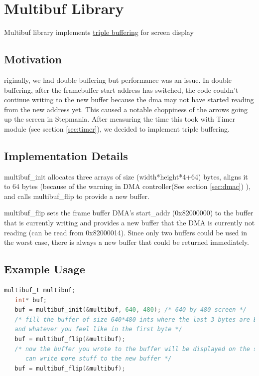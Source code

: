 \documentclass[10pt]{article}
\begin{document}
\section{Multibuf Library}

\label{sec:multibuf}

Multibuf library implements \href{http://en.wikipedia.org/wiki/Multiple_buffering#Triple_buffering}{triple buffering} for screen display 

\subsection{Motivation}

riginally, we had double buffering but performance was an issue. In double buffering, after the framebuffer start address has switched, the code couldn't continue writing to the new buffer because the dma may not have started reading from the new address yet. This caused a notable choppiness of the arrows going up the screen in Stepmania. After measuring the time this took with Timer module (see section \ref{sec:timer}), we decided to implement triple buffering. 

\subsection{Implementation Details}

multibuf\_init allocates three arrays of size (width*height*4+64) bytes, aligns it to 64 bytes (because of the warning in DMA controller(See section \ref{sec:dmac}) ), and calls multibuf\_flip to provide a new buffer.

multibuf\_flip sets the frame buffer DMA's start\_addr (0x82000000) to the buffer that is currently writing and provides a new buffer that the DMA is currently not reading (can be read from 0x82000014). Since only two buffers could be used in the worst case, there is always a new buffer that could be returned immediately.

\subsection{Example Usage}

\begin{lstlisting}[basicstyle=\footnotesize,language=C]
   multibuf_t multibuf;
   int* buf;
   buf = multibuf_init(&multibuf, 640, 480); /* 640 by 480 screen */
   /* fill the buffer of size 640*480 ints where the last 3 bytes are BGR (thanks to little endianness)
   and whatever you feel like in the first byte */
   buf = multibuf_flip(&multibuf); 
   /* now the buffer you wrote to the buffer will be displayed on the screen and you 
      can write more stuff to the new buffer */
   buf = multibuf_flip(&multibuf);
\end{lstlisting}
\end{document}
